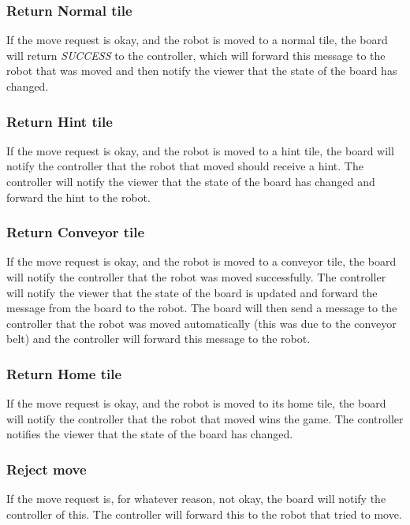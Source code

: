 	

	\subsubsection{Return Normal tile}
	If the move request is okay, and the robot is moved to a normal tile, the board will return \emph{SUCCESS} to the controller, which will forward this message to the robot that was moved and then notify the viewer that the state of the board has changed.

	

	\subsubsection{Return Hint tile}
	If the move request is okay, and the robot is moved to a hint tile, the board will notify the controller that the robot that moved should receive a hint. The controller will notify the viewer that the state of the board has changed and forward the hint to the robot.

	

	\subsubsection{Return Conveyor tile}
	If the move request is okay, and the robot is moved to a conveyor tile, the board will notify the controller that the robot was moved successfully. The controller will notify the viewer that the state of the board is updated and forward the message from the board to the robot. The board will then send a message to the controller that the robot was moved automatically (this was due to the conveyor belt) and the controller will forward this message to the robot.

	

	\subsubsection{Return Home tile}
	If the move request is okay, and the robot is moved to its home tile, the board will notify the controller that the robot that moved wins the game. The controller notifies the viewer that the state of the board has changed.

	


	\subsubsection{Reject move}
	If the move request is, for whatever reason, not okay, the board will notify the controller of this. The controller will forward this to the robot that tried to move.


